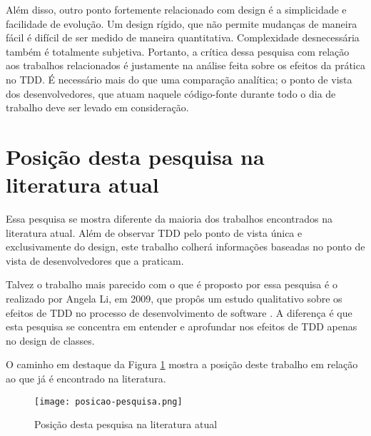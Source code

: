 Além disso, outro ponto fortemente relacionado com design é a simplicidade e
facilidade de evolução. Um design rígido, que não permite mudanças de maneira
fácil é difícil de ser medido de maneira quantitativa. Complexidade
desnecessária também é totalmente subjetiva. Portanto, a crítica dessa pesquisa
com relação aos trabalhos relacionados é justamente na análise feita sobre os
efeitos da prática no TDD. É necessário mais do que uma comparação analítica; o
ponto de vista dos desenvolvedores, que atuam naquele código-fonte durante todo
o dia de trabalho deve ser levado em consideração.

\section{Posição desta pesquisa na literatura atual}

Essa pesquisa se mostra diferente da maioria dos trabalhos encontrados na
literatura atual. Além de observar TDD pelo ponto de vista única e
exclusivamente do design, este trabalho colherá informações baseadas no ponto de
vista de desenvolvedores que a praticam.

Talvez o trabalho mais parecido com o que é proposto por essa pesquisa é o
realizado por Angela Li, em 2009, que propôs um estudo qualitativo sobre os
efeitos de TDD no processo de desenvolvimento de software \cite{angela-li}. 
A diferença é que esta pesquisa se concentra em entender e aprofundar nos
efeitos de TDD apenas no design de classes.

O caminho em destaque da Figura \ref{fig:posicao-pesquisa} mostra a posição
deste trabalho em relação ao que já é encontrado na literatura.

\begin{figure}
  \centering
  \texttt{[image: posicao-pesquisa.png]}
  \caption{Posição desta pesquisa na literatura atual}
  \label{fig:posicao-pesquisa}
\end{figure}

